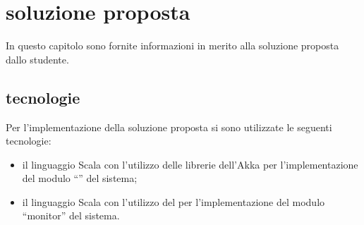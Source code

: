%
\chapter*{soluzione proposta}
\label{soluzione-proposta}
In questo capitolo sono fornite informazioni in merito alla soluzione proposta dallo studente.

\section*{tecnologie}
\label{soluzione-proposta-tecnologie}
Per l'implementazione della soluzione proposta si sono utilizzate le seguenti tecnologie:

\begin{itemize}
\item{il linguaggio Scala con l'utilizzo delle librerie dell'Akka  per l'implementazione del modulo ``'' del sistema;}
\item{il linguaggio Scala con l'utilizzo del  per l'implementazione del modulo ``monitor'' del sistema.}
\end{itemize}

